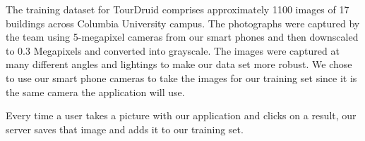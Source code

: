 The training dataset for TourDruid comprises approximately 1100 images of 17 buildings across Columbia University campus. The photographs were captured by the team using 5-megapixel cameras from our smart phones and then downscaled to 0.3 Megapixels and converted into grayscale. The images were captured at many different angles and lightings to make our data set more robust. We chose to use our smart phone cameras to take the images for our training set since it is the same camera the application will use.

Every time a user takes a picture with our application and clicks on a result, our server saves that image and adds it to our training set. 